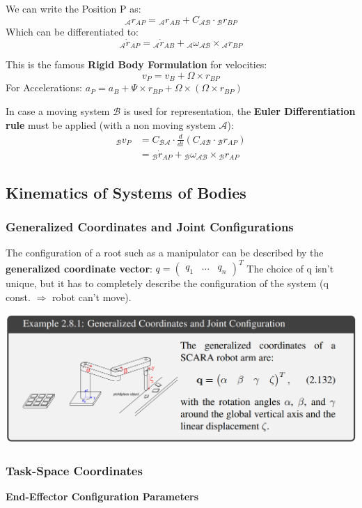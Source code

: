 \documentclass[fontsize=6pt,DIV=calc,a4paper,ngerman]{scrartcl}
\begin{document}
\begin{multicols*}{4}
	We can write the Position P as:
	$${}_\mathcal{A}r_{AP}={}_\mathcal{A}r_{AB}+C_\mathcal{AB}\cdot {}_\mathcal{B}r_{BP}$$
	Which can be differentiated to:
	$${}_\mathcal{A}\dot{r}_{AP}={}_\mathcal{A}\dot{r}_{AB}+{}_\mathcal{A}\omega_\mathcal{AB}\times {}_\mathcal{A}r_{BP}$$

	This is the famous \textbf{Rigid Body Formulation} for velocities:
	$$v_P=v_B+\Omega \times r_{BP}$$
	For Accelerations:
	$a_P=a_B+\Psi\times r_{BP}+\Omega\times(\Omega\times r_{BP})$

	\smallskip
	In case a moving system $\mathcal{B}$ is used for representation, the \textbf{Euler Differentiation rule} must be applied (with a non moving system $\mathcal{A}$):
	\begin{align*}
		{}_\mathcal{B}v_P
		 & = C_\mathcal{BA} \cdot \frac{d}{dt}(C_\mathcal{AB}\cdot {}_\mathcal{B}r_{AP})             \\
		 & = {}_\mathcal{B}\dot{r}_{AP}+{}_\mathcal{B}\omega_\mathcal{AB}\times {}_\mathcal{B}r_{AP}
	\end{align*}

	\subsection{Kinematics of Systems of Bodies}
	\subsubsection{Generalized Coordinates and Joint Configurations}
	The configuration of a root such as a manipulator can be described by the \textbf{generalized coordinate vector}: $q=\begin{pmatrix}q_1 &\dots & q_n\end{pmatrix}^T$
	The choice of q isn't unique, but it has to completely describe the configuration of the system (q const. $\Rightarrow$ robot can't move).

	\begin{center}
		\includegraphics[width=0.8\linewidth]{general_coords_SCARA.png}
	\end{center}
	\subsubsection{Task-Space Coordinates}
	\textbf{End-Effector Configuration Parameters}


\end{multicols*}
\end{document}
